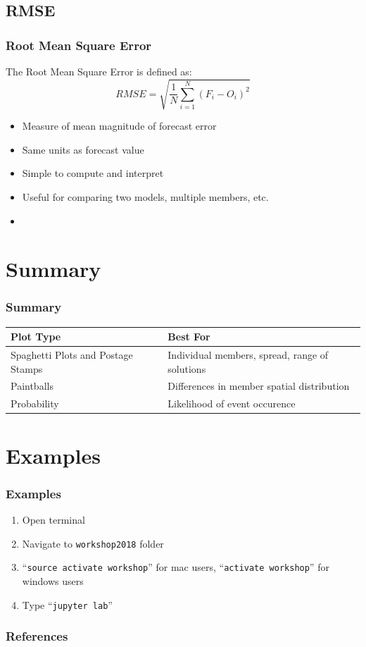 \documentclass{beamer}
\begin{document}
\subsection{RMSE}
\begin{frame}
  \frametitle{Root Mean Square Error}
  The Root Mean Square Error is defined as:
  \begin{equation}
    RMSE = \sqrt{\frac{1}{N}\sum_{i=1}^{N}(F_i - O_i)^2}
  \end{equation}
  \begin{itemize}
    \item Measure of mean magnitude of forecast error
    \item Same units as forecast value
    \item Simple to compute and interpret
    \item Useful for comparing two models, multiple members, etc.
    \item \cite{Holmes2000}
  \end{itemize}
\end{frame}

\section{Summary}
\begin{frame}
  \frametitle{Summary}
  \begin{center}

{\renewcommand{\arraystretch}{3}
   \begin{tabu} to 0.99\textwidth { | X[l, m] | X[l, m] | }
 \hline
 Plot Type & Best For \\ 
 \hline
 Spaghetti Plots and Postage Stamps & Individual members, spread, range of solutions \\ 
 \hline
 Paintballs & Differences in member spatial distribution \\
 \hline
 Probability & Likelihood of event occurence \\ 
 
 \hline
\end{tabu}}
\end{center}
\end{frame}

\section{Examples}
\begin{frame}
  \frametitle{Examples}
  \begin{enumerate}
    \item Open terminal
    \item Navigate to {\tt workshop2018} folder
    \item ``{\tt source activate workshop}'' for mac users, ``{\tt activate workshop}'' for windows users
    \item Type ``{\tt jupyter lab}''
  \end{enumerate}
\end{frame}
\begin{frame}
        \frametitle{References}
        
        \small
        
\end{frame}

%
%
\end{document}

